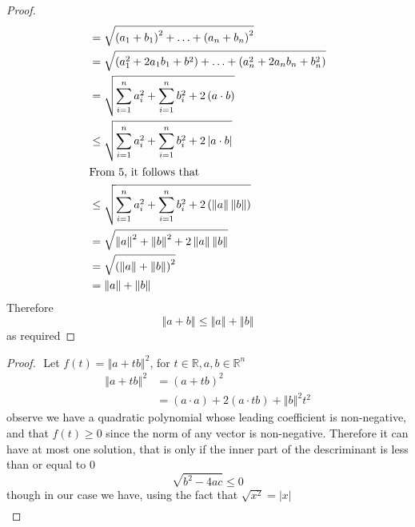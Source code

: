 \documentclass[11pt]{book}
\begin{document}
\begin{enumerate}
\begin{proof}
\begin{align*}
            &= \sqrt{\left( a_{1}  + b_1 \right)^2  + \ldots  + \left( a_{n}  + b_{n}  \right) ^2  }   \\ 
            &= \sqrt{\left( a_1^2  + 2a_1b_1 + b^2  \right)  + \ldots  + \left( a_{n} ^2  + 2a_{n} b_{n}  + b_{n} ^2  \right) }   \\ 
            &= \sqrt{\sum_{i=1}^{n} a_{i} ^2  + \sum_{i=1}^{n} b_{i} ^2  + 2\left( a \cdot b \right)   }   \\ 
            &\le    \sqrt{\sum_{i=1}^{n} a_{i} ^2  + \sum_{i=1}^{n} b_{i} ^2  + 2\left| a \cdot b \right|     }   \\ 
            \intertext{From 5, it follows that } 
            &\le     \sqrt{\sum_{i=1}^{n} a_{i} ^2  + \sum_{i=1}^{n} b_{i} ^2  + 2\left( \left\Vert a \right\Vert \left\Vert b \right\Vert  \right)     }   \\ 
            &= \sqrt{\left\Vert a \right\Vert ^2  + \left\Vert b \right\Vert ^2  + 2\left\Vert a \right\Vert \left\Vert b \right\Vert }   \\ 
            &= \sqrt{\left( \left\Vert a \right\Vert  +  \left\Vert b \right\Vert  \right)^2  }  \\ 
            &= \left\Vert a \right\Vert  + \left\Vert b \right\Vert    \\ 
        \end{align*}
        Therefore 
        \[
        \left\Vert a + b \right\Vert \le \left\Vert a \right\Vert  + \left\Vert b \right\Vert 
        \]
        as required
    \end{proof}
    \begin{proof}
    $ $\newline
        Let $f\left(t\right) = \left\Vert a + tb \right\Vert ^2 $, for $t \in \mathbb{R}, a, b \in  \mathbb{R} ^{n}  $  
\begin{align*}
    \left\Vert a + tb \right\Vert ^2 &= \left( a + tb \right) ^2 
    \\ 
    &= \left( a \cdot a \right)  + 2\left( a \cdot tb \right)  + \left\Vert b \right\Vert ^2 t^2 
\end{align*}
    observe we have a quadratic polynomial whose leading coefficient is non-negative, and that $f\left(t\right) \ge 0$ since the norm of any vector is non-negative. Therefore it can have at most one solution, that is only if the inner part of the descriminant is less than or equal to 0
    \[
    \sqrt{b^2  - 4ac} \le 0
    \]
    though in our case we have, using the fact that $\sqrt{x^2 } = \left| x \right| $ 
    \begin{gather*}

\end{gather*}
\end{proof}
\end{enumerate}
\end{document}

